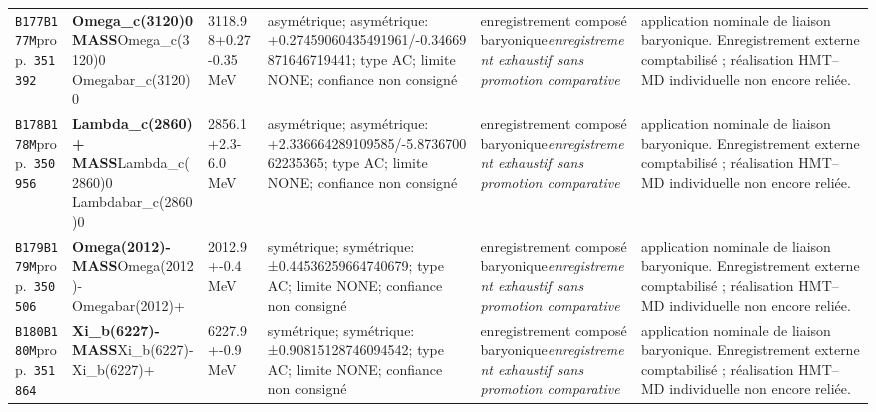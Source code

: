 \begin{landscape}
\begin{longtable}{L{1.85cm}L{4.45cm}L{2.35cm}L{4.05cm}L{3.35cm}L{7.15cm}}
\texttt{B177}\newline \texttt{B177M}\newline prop.\ \texttt{351392} & \textbf{Omega\_\allowbreak{}c(3120)0 MASS}\newline Omega\_\allowbreak{}c(3120)0 \textbar{}\allowbreak{} Omegabar\_\allowbreak{}c(3120)0 & 3118.98+0.27-0.35\,MeV & asymétrique; asymétrique: +0.27459060435491961/-0.34669871646719441; type AC; limite NONE; confiance non consigné & enregistrement composé baryonique\newline \emph{enregistrement exhaustif sans promotion comparative} & application nominale de liaison baryonique. Enregistrement externe comptabilisé ; réalisation HMT--MD individuelle non encore reliée. \\
\texttt{B178}\newline \texttt{B178M}\newline prop.\ \texttt{350956} & \textbf{Lambda\_\allowbreak{}c(2860)+ MASS}\newline Lambda\_\allowbreak{}c(2860)0 \textbar{}\allowbreak{} Lambdabar\_\allowbreak{}c(2860)0 & 2856.1+2.3-6.0\,MeV & asymétrique; asymétrique: +2.336664289109585/-5.873670062235365; type AC; limite NONE; confiance non consigné & enregistrement composé baryonique\newline \emph{enregistrement exhaustif sans promotion comparative} & application nominale de liaison baryonique. Enregistrement externe comptabilisé ; réalisation HMT--MD individuelle non encore reliée. \\
\texttt{B179}\newline \texttt{B179M}\newline prop.\ \texttt{350506} & \textbf{Omega(2012)- MASS}\newline Omega(2012)- \textbar{}\allowbreak{} Omegabar(2012)+ & 2012.9+-0.4\,MeV & symétrique; symétrique: ±0.44536259664740679; type AC; limite NONE; confiance non consigné & enregistrement composé baryonique\newline \emph{enregistrement exhaustif sans promotion comparative} & application nominale de liaison baryonique. Enregistrement externe comptabilisé ; réalisation HMT--MD individuelle non encore reliée. \\
\texttt{B180}\newline \texttt{B180M}\newline prop.\ \texttt{351864} & \textbf{Xi\_\allowbreak{}b(6227)- MASS}\newline Xi\_\allowbreak{}b(6227)- \textbar{}\allowbreak{} Xi\_\allowbreak{}b(6227)+ & 6227.9+-0.9\,MeV & symétrique; symétrique: ±0.90815128746094542; type AC; limite NONE; confiance non consigné & enregistrement composé baryonique\newline \emph{enregistrement exhaustif sans promotion comparative} & application nominale de liaison baryonique. Enregistrement externe comptabilisé ; réalisation HMT--MD individuelle non encore reliée. \\

\end{longtable}
\end{landscape}

